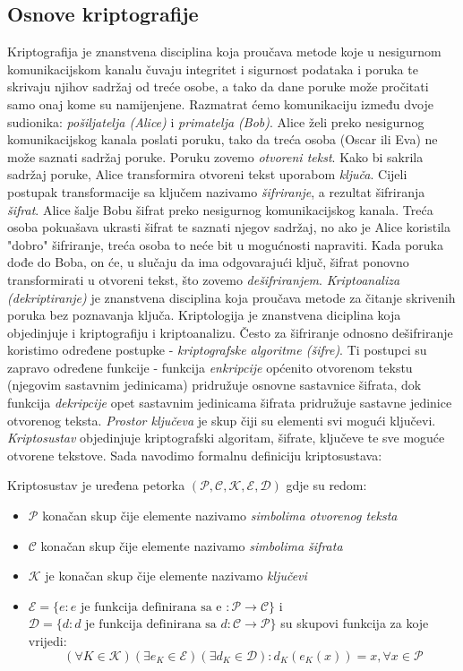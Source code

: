 \documentclass[a4paper,oneside,12pt]{memoir} %
\begin{document}
\begin{spacing}{1.5}
\section{Osnove kriptografije}
Kriptografija je znanstvena disciplina koja proučava metode koje u nesigurnom komunikacijskom kanalu  čuvaju integritet i sigurnost podataka i poruka te skrivaju njihov sadržaj od treće osobe, a tako da dane poruke može pročitati samo onaj kome su namijenjene. Razmatrat ćemo komunikaciju između dvoje sudionika: \textit{pošiljatelja (Alice)} i \textit{primatelja (Bob)}. Alice želi preko nesigurnog komunikacijskog kanala poslati poruku, tako da  treća osoba (Oscar ili Eva) ne može saznati sadržaj poruke. Poruku zovemo \textit{otvoreni tekst}. Kako bi sakrila sadržaj poruke, Alice transformira otvoreni tekst uporabom \textit{ključa}. Cijeli postupak transformacije sa ključem nazivamo \textit{šifriranje}, a rezultat šifriranja \textit{šifrat}. Alice šalje Bobu šifrat preko nesigurnog komunikacijskog kanala. Treća osoba pokuašava ukrasti šifrat te saznati njegov sadržaj, no ako je Alice koristila "dobro" šifriranje, treća osoba to neće bit u mogućnosti napraviti. Kada poruka dođe do Boba, on će, u slučaju da ima odgovarajući ključ, šifrat ponovno transformirati u otvoreni tekst, što zovemo \textit{dešifriranjem}. \textit{Kriptoanaliza (dekriptiranje)} je znanstvena disciplina koja proučava metode za čitanje skrivenih poruka bez poznavanja ključa. Kriptologija je znanstvena diciplina koja objedinjuje i kriptografiju i kriptoanalizu. Često za šifriranje odnosno dešifriranje koristimo određene postupke - \textit{kriptografske algoritme (šifre)}. Ti postupci su zapravo određene funkcije - funkcija \textit{enkripcije} općenito otvorenom tekstu (njegovim sastavnim jedinicama) pridružuje osnovne sastavnice šifrata, dok funkcija \textit{dekripcije} opet sastavnim jedinicama šifrata pridružuje sastavne jedinice otvorenog teksta. \textit{Prostor ključeva} je skup čiji su elementi svi mogući ključevi. \textit{Kriptosustav} objedinjuje kriptografski algoritam,   šifrate, ključeve te sve moguće otvorene tekstove.
Sada navodimo formalnu definiciju kriptosustava:
\begin{defn}
Kriptosustav je uređena petorka $(\mathcal{P}, \mathcal{C}, \mathcal{K}, \mathcal{E}, \mathcal{D})$ gdje su redom:
\begin{itemize}
	\item $\mathcal{P}$ konačan skup čije elemente nazivamo \textit{simbolima otvorenog teksta}
	\item $\mathcal{C}$ konačan skup čije elemente nazivamo \textit{simbolima šifrata}
	\item $\mathcal{K}$ je konačan skup čije elemente nazivamo \textit{ključevi}
	\item $\mathcal{E}=\{e :e \text{  je funkcija definirana sa e }:\mathcal{P} \to \mathcal{C} \}$ i $\mathcal{D}=\{d: d\text{ je funkcija definirana sa } d: \mathcal{C} \to \mathcal{P}\}$ su skupovi funkcija za koje vrijedi:
	\[(\forall K \in \mathcal{K})(\exists e_K \in \mathcal{E})(\exists d_K \in \mathcal{D}) : d_K(e_K(x))=x, \forall x \in \mathcal{P} \]
	

\end{itemize}
\end{defn}
\end{spacing}
\end{document}
